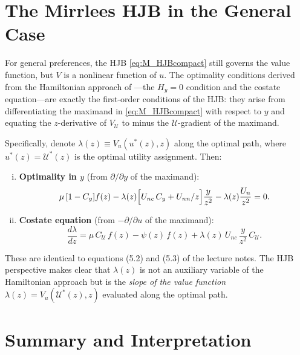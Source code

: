 \documentclass[12pt]{article}
\newcommand{\calU}{\mathcal{U}}
\begin{document}
\section{The Mirrlees HJB in the General Case}
\label{sec:general}

For general preferences, the HJB \eqref{eq:M_HJBcompact} still governs the
value function, but $V$ is a nonlinear function of $u$.  The optimality
conditions derived from the Hamiltonian approach of \citet{Bhandari2026}---the
$H_y = 0$ condition and the costate equation---are exactly the first-order
conditions of the HJB: they arise from differentiating the maximand in
\eqref{eq:M_HJBcompact} with respect to $y$ and equating the $z$-derivative
of $V_\calU$ to minus the $\calU$-gradient of the maximand.

Specifically, denote $\lambda(z) \equiv V_u(u^*(z), z)$ along the optimal
path, where $u^*(z) = \calU^*(z)$ is the optimal utility assignment.  Then:

\begin{enumerate}[(i)]

\item \textbf{Optimality in $y$} (from $\partial/\partial y$ of the maximand):
\begin{equation}\label{eq:M_Hy_general}
  \mu \, [1 - C_y] f(z)
  - \lambda(z)\Bigl[U_{nc}\, C_y + U_{nn}/z\Bigr]\frac{y}{z^2}
  - \lambda(z)\frac{U_n}{z^2} = 0.
\end{equation}

\item \textbf{Costate equation} (from $-\partial/\partial u$ of the maximand):
\begin{equation}\label{eq:M_costate_general}
  \frac{d\lambda}{dz} = \mu\, C_\calU\, f(z) - \psi(z)\, f(z)
  + \lambda(z)\, U_{nc}\,\frac{y}{z^2}\, C_\calU.
\end{equation}

\end{enumerate}
These are identical to equations (5.2) and (5.3) of the lecture notes.  The HJB
perspective makes clear that $\lambda(z)$ is not an auxiliary variable of the
Hamiltonian approach but is the \emph{slope of the value function}
$\lambda(z) = V_u(\calU^*(z), z)$ evaluated along the optimal path.

\section{Summary and Interpretation}
\label{sec:summary}
\end{document}
